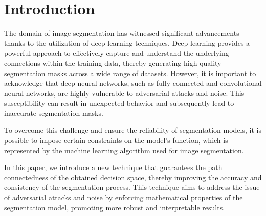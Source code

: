 \section{Introduction}

The domain of image segmentation has witnessed significant advancements thanks to the utilization of deep learning techniques.
Deep learning provides a powerful approach to effectively capture and understand the underlying connections within the training data,
thereby generating high-quality segmentation masks across a wide range of datasets.
However, it is important to acknowledge that deep neural networks, such as fully-connected and convolutional neural networks,
are highly vulnerable to adversarial attacks and noise. This susceptibility can result in unexpected behavior and
subsequently lead to inaccurate segmentation masks.

To overcome this challenge and ensure the reliability of segmentation models, it is possible to impose certain constraints on the model's function,
which is represented by the machine learning algorithm used for image segmentation.

In this paper, we introduce a new technique that guarantees the path connectedness of the obtained decision space,
thereby improving the accuracy and consistency of the segmentation process.
This technique aims to address the issue of adversarial attacks and noise by enforcing mathematical properties of the segmentation model,
promoting more robust and interpretable results.